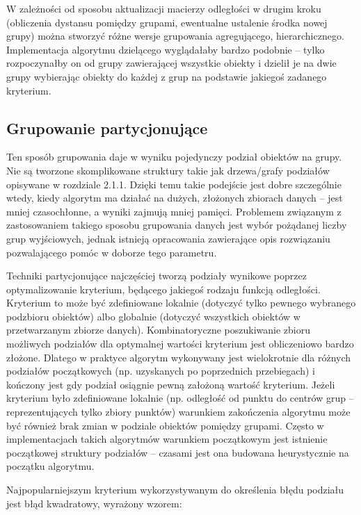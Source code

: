 \documentclass{article}
\begin{document}
W zależności od sposobu aktualizacji macierzy odległości w drugim kroku (obliczenia dystansu pomiędzy grupami, ewentualne ustalenie środka nowej grupy) można stworzyć różne wersje grupowania agregującego, hierarchicznego. Implementacja algorytmu dzielącego wyglądałaby bardzo podobnie – tylko rozpoczynałby on od grupy zawierającej wszystkie obiekty i dzielił je na dwie grupy wybierając obiekty do każdej z grup na podstawie jakiegoś zadanego kryterium\cite{jain_clustering}.

\subsection{Grupowanie partycjonujące} \label{partition_clustering_section}
Ten sposób grupowania daje w wyniku pojedynczy podział obiektów na grupy. Nie są tworzone skomplikowane struktury takie jak drzewa/grafy podziałów opisywane w rozdziale 2.1.1. Dzięki temu takie podejście jest dobre szczególnie wtedy, kiedy algorytm ma działać na dużych, złożonych zbiorach danych – jest mniej czasochłonne, a wyniki zajmują mniej pamięci. Problemem związanym z zastosowaniem takiego sposobu grupowania danych jest wybór pożądanej liczby grup wyjściowych, jednak istnieją opracowania zawierające opis rozwiązaniu pozwalającego pomóc w doborze tego parametru\cite[5.2]{jain_clustering,clustering_book}.
 
Techniki partycjonujące najczęściej tworzą podziały wynikowe poprzez optymalizowanie kryterium, będącego jakiegoś rodzaju funkcją odległości. Kryterium to może być zdefiniowane lokalnie (dotyczyć tylko pewnego wybranego podzbioru obiektów) albo globalnie (dotyczyć wszystkich obiektów w przetwarzanym zbiorze danych). Kombinatoryczne poszukiwanie zbioru możliwych podziałów dla optymalnej wartości kryterium jest obliczeniowo bardzo złożone. Dlatego w praktyce algorytm wykonywany jest wielokrotnie dla różnych podziałów początkowych (np. uzyskanych po poprzednich przebiegach) i kończony jest gdy podział osiągnie pewną założoną wartość kryterium. Jeżeli kryterium było zdefiniowane lokalnie (np. odległość od punktu do centrów grup – reprezentujących tylko zbiory punktów) warunkiem zakończenia algorytmu może  być również brak zmian w podziale obiektów pomiędzy grupami. Często w implementacjach takich algorytmów warunkiem początkowym jest istnienie początkowej struktury podziałów – czasami jest ona budowana heurystycznie na początku algorytmu. 

Najpopularniejszym kryterium wykorzystywanym do określenia błędu podziału jest błąd kwadratowy, wyrażony wzorem:
\end{document}

